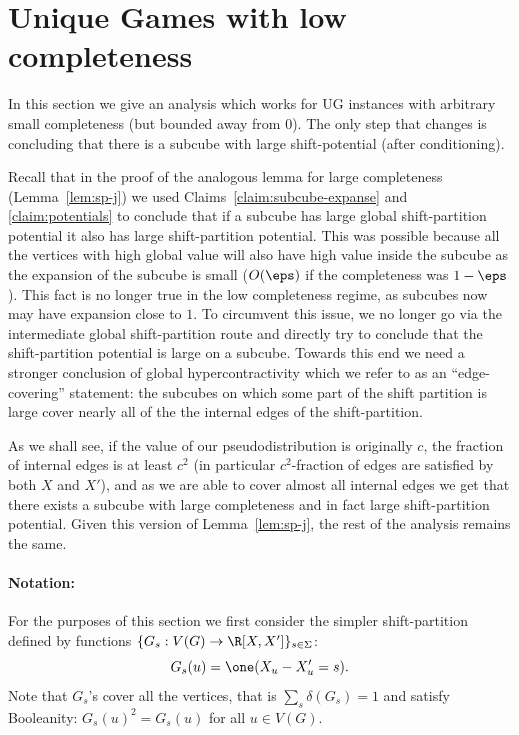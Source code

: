 \section{Unique Games with low completeness}\label{sec:johnson_2}
In this section we give an analysis which works for UG instances with arbitrary small completeness (but bounded away from $0$). The only step that changes is concluding that there is a subcube with large shift-potential (after conditioning). 

Recall that in the proof of the analogous lemma for large completeness (Lemma~\ref{lem:sp-j}) 
we used Claims~\ref{claim:subcube-expanse} and \ref{claim:potentials} to conclude that if a subcube has large global shift-partition potential it also has large shift-partition potential. This was possible 
because all the vertices with high global value will also have high value inside the subcube as the expansion of the subcube is small ($O(\eps)$ if the completeness was $1-\eps$). This fact is no longer true in the low completeness regime, as subcubes 
now may have expansion close to $1$.
To circumvent this issue, we no longer go via the intermediate global shift-partition route and 
directly try to conclude that the shift-partition potential is large on a subcube. Towards this end 
we need a stronger conclusion of global hypercontractivity which we refer to 
as an ``edge-covering'' statement: the subcubes on which some part of the shift partition is large cover nearly all of the the internal edges of the shift-partition. 

As we shall see, if the value of our pseudodistribution is originally $c$, the 
fraction of internal edges is at least $c^2$ (in particular $c^2$-fraction of edges are satisfied by both $X$ and $X'$), and as we are able to cover almost all internal edges we get that there exists a subcube with large completeness and in fact large shift-partition potential. Given this version of Lemma~\ref{lem:sp-j}, the rest of the analysis remains the same. 

\paragraph{Notation:}
For the purposes of this section we first consider the simpler shift-partition defined by functions $\{G_s: V(G) \rightarrow \R[X,X']\}_{s \in \Sigma}$:
\[G_s(u) = \one(X_u - X'_u = s).\]
Note that $G_s$'s cover all the vertices, that is $\sum_s \delta(G_s) = 1$ and satisfy Booleanity: $G_s(u)^2 = G_s(u)$ for all $u \in V(G)$.

